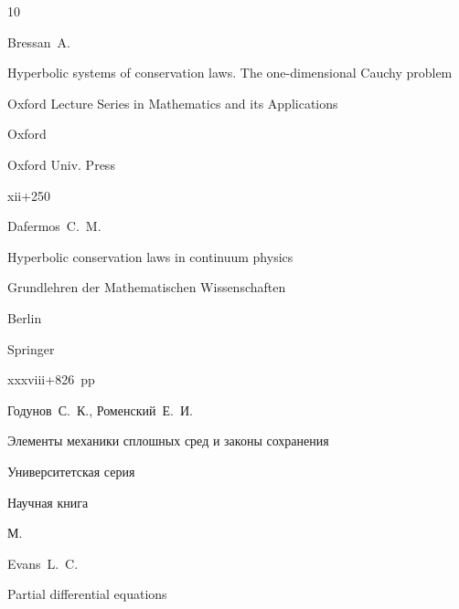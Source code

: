 \begin{thebibliography}{10}




\by Bressan~A.

\book Hyperbolic systems of conservation laws. The one-dimensional Cauchy problem


\serial Oxford Lecture Series in Mathematics and its Applications


\publaddr Oxford

\publ Oxford Univ. Press

\totalpages xii+250 









\by Dafermos~C.~M.

\book Hyperbolic conservation laws in continuum physics


\serial Grundlehren der Mathematischen Wissenschaften 


\publaddr Berlin


\publ Springer 

\totalpages xxxviii+826~pp \nofrills







\by Годунов~С.~К., Роменский~Е.~И.

\book Элементы механики сплошных сред и законы сохранения

\serial Университетская серия



\publ Научная книга

\publaddr М.





\by Evans~L.~C.

\book Partial differential equations


\end{thebibliography}

